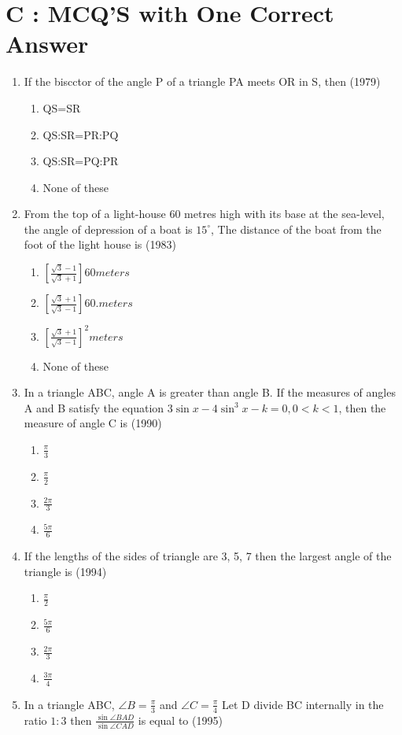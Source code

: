\documentclass[12pt]{article}
\providecommand{\sbrak}[1]{\ensuremath{{}\left[#1\right]}}
\begin{document}
\section*{C  :   MCQ'S with One Correct Answer}

\begin{enumerate}
\item If the biscctor of the angle P of a triangle PA meets OR in S, then (1979)
\begin{enumerate}
\item QS=SR
\item QS:SR=PR:PQ
\item QS:SR=PQ:PR
\item None of these 
\end{enumerate}
\item From the top of a light-house 60 metres high with its base at the sea-level, the angle of depression of a boat is $15^\circ$, The distance of the boat from the foot of the light house is (1983)
\begin{enumerate}
\item $\sbrak{\frac{\sqrt{3}-1}{\sqrt{3}+1}}60 meters$
\item $\sbrak{\frac{\sqrt{3}+1}{\sqrt{3}-1}}60 .meters$
\item $\sbrak{\frac{\sqrt{3}+1}{\sqrt{3}-1}}^2 meters$
\item None of these 
\end{enumerate}
\item In a triangle ABC, angle A is greater than angle B. If the measures of angles A and B satisfy the equation $3\sin x-4\sin^3x-k=0,0<k<1$, then the measure of angle C is (1990)
\begin{enumerate}
\item  $\frac{\pi}{3}$
\item  $\frac{\pi}{2}$
\item  $\frac{2\pi}{3}$
\item  $\frac{5\pi}{6}$
\end{enumerate}
\item If the lengths of the sides of triangle are 3, 5, 7 then the largest angle of the triangle is (1994)
\begin{enumerate}
\item $\frac{\pi}{2}$
\item  $\frac{5\pi}{6}$
\item  $\frac{2\pi}{3}$
\item  $\frac{3\pi}{4}$
\end{enumerate}
\item  In a triangle ABC, $\angle B=\frac{\pi}{3}$ and $\angle C= \frac{\pi}{4}$ Let D divide BC internally in the ratio $1:3$ then $\frac{\sin \angle BAD}{\sin \angle CAD}$ is equal to (1995)

\end{enumerate}
\end{document}
